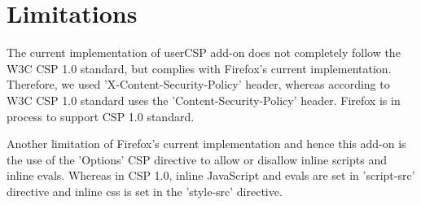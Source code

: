 \section{Limitations}
\label{sec:limit}

The current implementation of userCSP add-on does not completely
follow the W3C CSP 1.0 standard, but complies with Firefox's current
implementation. Therefore, we used 'X-Content-Security-Policy' header,
whereas according to W3C CSP 1.0 standard uses the
'Content-Security-Policy' header. Firefox is in process to support CSP
1.0 standard.

Another limitation of Firefox's current implementation and hence this
add-on is the use of the 'Options' CSP directive to allow or disallow
inline scripts and inline evals. Whereas in CSP 1.0, inline JavaScript
and evals are set in 'script-src' directive and inline css is set in
the 'style-src' directive.
